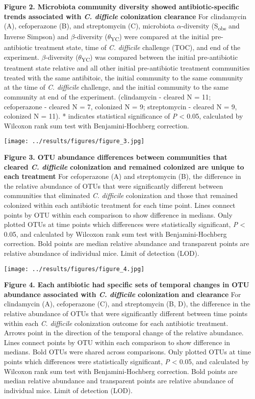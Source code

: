 \documentclass[11pt,]{article}
\begin{document}
\textbf{Figure 2. Microbiota community diversity showed
antibiotic-specific trends associated with \emph{C. difficle}
colonization clearance} For clindamycin (A), cefoperazone (B), and
streptomycin (C), microbiota \(\alpha\)-diversity (S\textsubscript{obs}
and Inverse Simpson) and \(\beta\)-diversity
(\(\theta\)\textsubscript{YC}) were compared at the initial
pre-antibiotic treatment state, time of \emph{C. difficile} challenge
(TOC), and end of the experiment. \(\beta\)-diversity
(\(\theta\)\textsubscript{YC}) was compared between the initial
pre-antibiotic treatment state relative and all other initial
pre-antibiotic treatment communities treated with the same antibitoic,
the initial community to the same community at the time of \emph{C.
difficile} challenge, and the initial community to the same community at
end of the experiment. (clindamycin - cleared N = 11; cefoperazone -
cleared N = 7, colonized N = 9; streptomycin - cleared N = 9, colonized
N = 11). * indicates statistical significance of \emph{P} \textless{}
0.05, calculated by Wilcoxon rank sum test with Benjamini-Hochberg
correction.

\hfill\break

\texttt{[image: ../results/figures/figure\_3.jpg]}

\textbf{Figure 3. OTU abundance differences between communities that
cleared \emph{C. difficile} colonization and remained colonized are
unique to each treatment} For cefoperazone (A) and streptomycin (B), the
difference in the relative abundance of OTUs that were significantly
different between communities that eliminated \emph{C. difficile}
colonization and those that remained colonized within each antibiotic
treatment for each time point. Lines connect points by OTU within each
comparison to show difference in medians. Only plotted OTUs at time
points which differences were statistically significant, \emph{P}
\textless{} 0.05, and calculated by Wilcoxon rank sum test with
Benjamini-Hochberg correction. Bold points are median relative abundance
and transparent points are relative abundance of individual mice. Limit
of detection (LOD).

\hfill\break

\texttt{[image: ../results/figures/figure\_4.jpg]}

\textbf{Figure 4. Each antibiotic had specific sets of temporal changes
in OTU abundance associated with \emph{C. difficile} colonization and
clearance} For clindamycin (A), cefoperazone (C), and streptomycin (B,
D), the difference in the relative abundance of OTUs that were
significantly different between time points within each \emph{C.
difficile} colonization outcome for each antibiotic treatment. Arrows
point in the direction of the temporal change of the relative abundance.
Lines connect points by OTU within each comparison to show difference in
medians. Bold OTUs were shared across comparisons. Only plotted OTUs at
time points which differences were statistically significant, \emph{P}
\textless{} 0.05, and calculated by Wilcoxon rank sum test with
Benjamini-Hochberg correction. Bold points are median relative abundance
and transparent points are relative abundance of individual mice. Limit
of detection (LOD).
\end{document}
